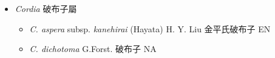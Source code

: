 
  \begin{itemize}
 \item[] \textit{Cordia} 破布子屬
                                
  \begin{itemize}
        \item[] \textit{C. aspera} subsp. \textit{kanehirai} (Hayata) H. Y. Liu  金平氏破布子   EN
        \item[] \textit{C. dichotoma} G.Forst.  破布子   NA
  \end{itemize}
  \end{itemize}
